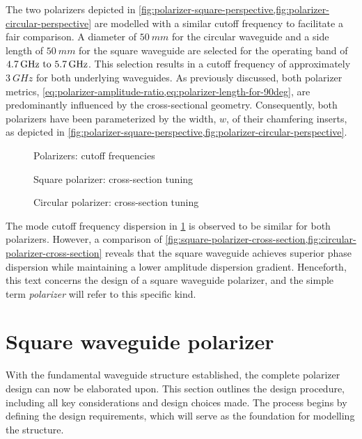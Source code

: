 \documentclass[11pt,a4paper,twoside,openany]{report}
\begin{document}
The two polarizers depicted in \cref{fig:polarizer-square-perspective,fig:polarizer-circular-perspective} are modelled with a similar cutoff frequency to facilitate a fair comparison. A diameter of $\qty{50}{mm}$ for the circular waveguide and a side length of $\qty{50}{mm}$ for the square waveguide are selected for the operating band of $\frequencyrange$. This selection results in a cutoff frequency of approximately $\qty{3}{GHz}$ for both underlying waveguides. As previously discussed, both polarizer metrics, \cref{eq:polarizer-amplitude-ratio,eq:polarizer-length-for-90deg}, are predominantly influenced by the cross-sectional geometry. Consequently, both polarizers have been parameterized by the width, $w$, of their chamfering inserts, as depicted in \cref{fig:polarizer-square-perspective,fig:polarizer-circular-perspective}.

\begin{figure}[h]
    \centering
    
    \caption{\label{fig:polarizers-cutoff-frequencies}Polarizers: cutoff frequencies}
\end{figure}

\begin{figure}
    \centering
    
    \caption{\label{fig:square-polarizer-cross-section}Square polarizer: cross-section tuning}
\end{figure}

\begin{figure}
    \centering
    
    \caption{\label{fig:circular-polarizer-cross-section}Circular polarizer: cross-section tuning}
\end{figure}

The mode cutoff frequency dispersion in \cref{fig:polarizers-cutoff-frequencies} is observed to be similar for both polarizers. However, a comparison of \cref{fig:square-polarizer-cross-section,fig:circular-polarizer-cross-section} reveals that the square waveguide achieves superior phase dispersion while maintaining a lower amplitude dispersion gradient. Henceforth, this text concerns the design of a square waveguide polarizer, and the simple term \emph{polarizer} will refer to this specific kind.

\section{Square waveguide polarizer}
With the fundamental waveguide structure established, the complete polarizer design can now be elaborated upon. This section outlines the design procedure, including all key considerations and design choices made. The process begins by defining the design requirements, which will serve as the foundation for modelling the structure.
\end{document}
